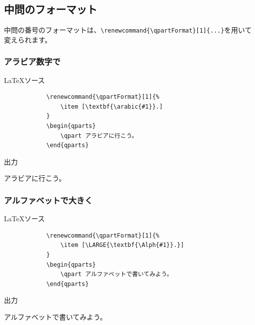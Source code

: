 \documentclass[dvipdfmx,a4j,11pt]{jarticle}
\newenvironment{inputbox}{%
	\begin{itembox}[r]{\LaTeX ソース}
}{
	\end{itembox}
}
\newenvironment{outputbox}{%
	\begin{itembox}[r]{出力}
}{%
	\end{itembox}
}
\begin{document}
\subsection{中問のフォーマット}
	中問の番号のフォーマットは、{\tt \verb"\renewcommand{\qpartFormat}[1]{...}"}を用いて変えられます。
	
\subsubsection{アラビア数字で}
	\begin{inputbox}
		\begin{verbatim}
			\renewcommand{\qpartFormat}[1]{%
			    \item [\textbf{\arabic{#1}}.]
			}
			\begin{qparts}
			    \qpart アラビアに行こう。
			\end{qparts}
		\end{verbatim}

	\end{inputbox}
	
	\begin{outputbox}
		\renewcommand{\qpartFormat}[1]{%
			\item [\textbf{\arabic{#1}}.]
		}
		\begin{qparts}
			\qpart アラビアに行こう。
		\end{qparts}
	\end{outputbox}
	
\subsubsection{アルファベットで大きく}
	\begin{inputbox}
		\begin{verbatim}
			\renewcommand{\qpartFormat}[1]{%
			    \item [\LARGE{\textbf{\Alph{#1}}.}]
			}
			\begin{qparts}
			    \qpart アルファベットで書いてみよう。
			\end{qparts}
		\end{verbatim}

	\end{inputbox}
	
	\begin{outputbox}
		\renewcommand{\qpartFormat}[1]{%
			\item [\LARGE{\textbf{\Alph{#1}}.}]
		}
		\begin{qparts}
			\qpart アルファベットで書いてみよう。
		\end{qparts}
	\end{outputbox}
	
\end{document}
